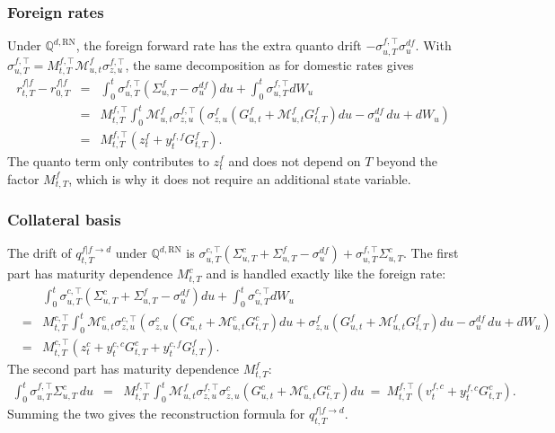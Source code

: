 \documentclass[11pt,english]{amsart}
\newcommand{\RN}{\mathrm{RN}}
\newcommand{\QQ}{\mathbb{Q}}
\theoremstyle{definition}
\begin{document}
\subsubsection{Foreign rates}
Under $\QQ^{d,\RN}$, the foreign forward rate has the extra quanto drift $-\sigma^{f,\top}_{u,T}\sigma^{df}_u$. With $\sigma^{f,\top}_{u,T} = M^{f,\top}_{t,T}\mathcal{M}^f_{u,t}\sigma^{f,\top}_{z,u}$, the same decomposition as for domestic rates gives
\begin{eqnarray*}
  r^{f|f}_{t,T}  - r^{f|f}_{0,T}
  &=& \int_0^t \sigma^{f,\top}_{u,T}\left( \Sigma^{f}_{u,T} - \sigma^{df}_u \right) du + \int_0^t \sigma^{f,\top}_{u,T} dW_u \\
  &=& M^{f,\top}_{t,T} \int_0^t \mathcal{M}^f_{u,t} \sigma^{f,\top}_{z,u} \left( \sigma^{f}_{z,u}\left(G^f_{u,t} + \mathcal{M}^f_{u,t}G^f_{t,T}\right) du - \sigma^{df}_u\, du +  dW_u \right) \\
  &=& M^{f,\top}_{t,T} \left( z^{f}_{t}  +  y^{f,f}_t G^{f}_{t,T}  \right) .
\end{eqnarray*}
The quanto term only contributes to $z^f_t$ and does not depend on $T$ beyond the factor $M^{f}_{t,T}$, which is why it does not require an additional state variable.

\subsubsection{Collateral basis}
The drift of $q^{f|f\to d}_{t,T}$ under $\QQ^{d,\RN}$ is $\sigma^{c,\top}_{u,T}(\Sigma^c_{u,T} + \Sigma^f_{u,T} - \sigma^{df}_u) + \sigma^{f,\top}_{u,T}\Sigma^{c}_{u,T}$. The first part has maturity dependence $M^c_{t,T}$ and is handled exactly like the foreign rate:
\begin{eqnarray*}
  & & \int_0^t \sigma^{c,\top}_{u,T}\left(\Sigma^c_{u,T} + \Sigma^f_{u,T} - \sigma^{df}_u\right) du + \int_0^t \sigma^{c,\top}_{u,T} dW_u \\
  &=& M^{c,\top}_{t,T} \int_0^t \mathcal{M}^c_{u,t}\sigma^{c,\top}_{z,u} \left( \sigma^c_{z,u}(G^c_{u,t} + \mathcal{M}^c_{u,t}G^c_{t,T}) du +  \sigma^f_{z,u}(G^f_{u,t} + \mathcal{M}^f_{u,t}G^f_{t,T}) du - \sigma^{df}_u\, du + dW_u \right) \\
  &=& M^{c,\top}_{t,T} \left( z^{c}_{t}  +  y^{c,c}_t G^{c}_{t,T} + y^{c,f}_t G^{f}_{t,T} \right) .
\end{eqnarray*}
The second part has maturity dependence $M^f_{t,T}$:
\begin{eqnarray*}
  \int_0^t \sigma^{f,\top}_{u,T}\Sigma^c_{u,T} \, du
  &=& M^{f,\top}_{t,T} \int_0^t \mathcal{M}^f_{u,t}\sigma^{f,\top}_{z,u} \sigma^c_{z,u}\left(G^c_{u,t} + \mathcal{M}^c_{u,t}G^c_{t,T}\right) du
  ~=~ M^{f,\top}_{t,T} \left( v^{f,c}_t + y^{f,c}_t G^c_{t,T} \right) .
\end{eqnarray*}
Summing the two gives the reconstruction formula for $q^{f|f\to d}_{t,T}$.
\end{document}
